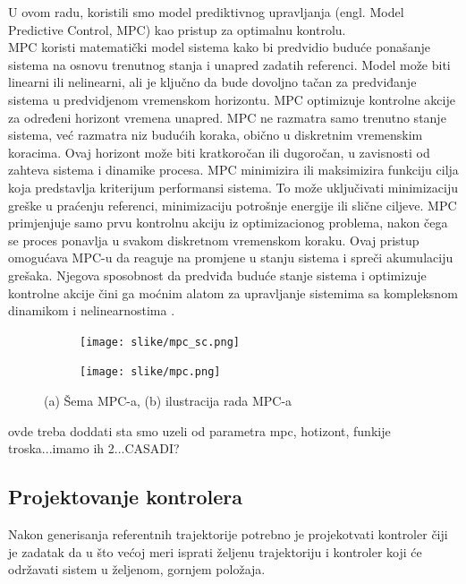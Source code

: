 \documentclass[a4paper,11pt]{article}
\theoremstyle{definition} \newtheorem{deff}{Definicija}[section]
\theoremstyle{definition} \newtheorem{prim}[deff]{Primer}
\theoremstyle{plain} \newtheorem{teor}[deff]{Teorema}
\begin{document}
	U ovom radu, koristili smo model prediktivnog upravljanja (engl. Model Predictive Control, MPC) kao pristup za optimalnu kontrolu. \\
	
	MPC koristi matematički model sistema kako bi predvidio buduće ponašanje sistema na osnovu trenutnog stanja i unapred zadatih referenci. Model može biti linearni ili nelinearni, ali je ključno da bude dovoljno tačan za predviđanje sistema u predvidjenom vremenskom horizontu. MPC optimizuje kontrolne akcije za određeni horizont vremena unapred. MPC ne razmatra samo trenutno stanje sistema, već razmatra niz budućih koraka, obično u diskretnim vremenskim koracima. Ovaj horizont može biti kratkoročan ili dugoročan, u zavisnosti od zahteva sistema i dinamike procesa. MPC minimizira ili maksimizira funkciju cilja koja predstavlja kriterijum performansi sistema. To može uključivati minimizaciju greške u praćenju referenci, minimizaciju potrošnje energije ili slične ciljeve. MPC primjenjuje samo prvu kontrolnu akciju iz optimizacionog problema, nakon čega se proces ponavlja u svakom diskretnom vremenskom koraku. Ovaj pristup omogućava MPC-u da reaguje na promjene u stanju sistema i spreči akumulaciju grešaka. Njegova sposobnost da predviđa buduće stanje sistema i optimizuje kontrolne akcije čini ga moćnim alatom za upravljanje sistemima sa kompleksnom dinamikom i nelinearnostima \cite{mpc}.\\
	
	
	\begin{figure}[!htb]
		\centering
		\begin{subfigure}{0.5\linewidth}
			\centering
			\texttt{[image: slike/mpc\_sc.png]}
			\caption{}
			\label{fig:mpc_sc}
		\end{subfigure}
		\hfill
		\begin{subfigure}{0.48\linewidth}
			\centering
			\texttt{[image: slike/mpc.png]}
			\caption{}
			\label{fig:mpc_f}
		\end{subfigure}
		\caption{(a) Šema MPC-a, (b) ilustracija rada MPC-a \cite{mpc} }
	\end{figure}
	
	
	ovde treba doddati sta smo uzeli od parametra mpc, hotizont, funkije troska...imamo ih 2...CASADI?
	
	
	\newpage
	\subsection{Projektovanje kontrolera}
	
	Nakon generisanja referentnih trajektorije potrebno je projekotvati kontroler čiji je zadatak da u što većoj meri isprati željenu trajektoriju i kontroler koji će održavati sistem u željenom, gornjem položaja. \\
	
\end{document}
